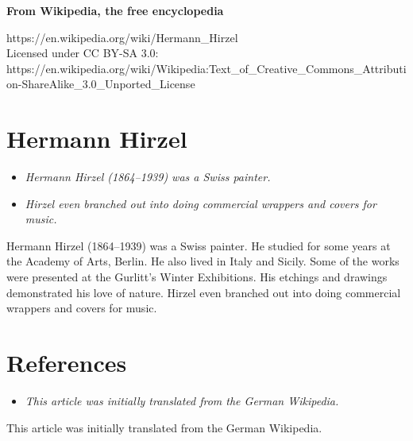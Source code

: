 \textbf{From Wikipedia, the free encyclopedia}

https://en.wikipedia.org/wiki/Hermann\_Hirzel\\
Licensed under CC BY-SA 3.0:\\
https://en.wikipedia.org/wiki/Wikipedia:Text\_of\_Creative\_Commons\_Attribution-ShareAlike\_3.0\_Unported\_License

\section{Hermann Hirzel}\label{hermann-hirzel}

\begin{itemize}
\item
  \emph{Hermann Hirzel (1864--1939) was a Swiss painter.}
\item
  \emph{Hirzel even branched out into doing commercial wrappers and
  covers for music.}
\end{itemize}

Hermann Hirzel (1864--1939) was a Swiss painter. He studied for some
years at the Academy of Arts, Berlin. He also lived in Italy and Sicily.
Some of the works were presented at the Gurlitt's Winter Exhibitions.
His etchings and drawings demonstrated his love of nature. Hirzel even
branched out into doing commercial wrappers and covers for music.

\section{References}\label{references}

\begin{itemize}
\item
  \emph{This article was initially translated from the German
  Wikipedia.}
\end{itemize}

This article was initially translated from the German Wikipedia.
